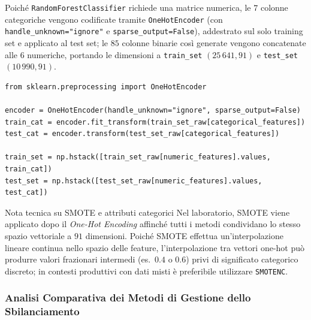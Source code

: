 Poich\'e \texttt{RandomForestClassifier} richiede una matrice numerica, le $7$ colonne categoriche vengono codificate tramite \texttt{OneHotEncoder} (con \texttt{handle\_\allowbreak unknown="ignore"} e \texttt{sparse\_\allowbreak output=False}), addestrato sul solo training set e applicato al test set; le $85$ colonne binarie cos\`i generate vengono concatenate alle $6$ numeriche, portando le dimensioni a \texttt{train\_set} $(25\,641, 91)$ e \texttt{test\_set} $(10\,990, 91)$.

\begin{lstlisting}[style=pythoncode, caption={Codifica One-Hot appresa sul solo training set per evitare data leakage.}]
from sklearn.preprocessing import OneHotEncoder

encoder = OneHotEncoder(handle_unknown="ignore", sparse_output=False)
train_cat = encoder.fit_transform(train_set_raw[categorical_features])
test_cat = encoder.transform(test_set_raw[categorical_features])

train_set = np.hstack([train_set_raw[numeric_features].values, train_cat])
test_set = np.hstack([test_set_raw[numeric_features].values, test_cat])
\end{lstlisting}

\begin{noteblock}{Nota tecnica su SMOTE e attributi categorici}
Nel laboratorio, SMOTE viene applicato dopo il \textit{One-Hot Encoding} affinch\'e tutti i metodi condividano lo stesso spazio vettoriale a $91$ dimensioni. Poich\'e SMOTE effettua un'interpolazione lineare continua nello spazio delle feature, l'interpolazione tra vettori one-hot pu\`o produrre valori frazionari intermedi (es.\ $0.4$ o $0.6$) privi di significato categorico discreto; in contesti produttivi con dati misti \`e preferibile utilizzare \texttt{SMOTENC}.
\end{noteblock}

\FloatBarrier
\subsubsection{Analisi Comparativa dei Metodi di Gestione dello Sbilanciamento}
\label{subsec:dm-lab-adult-results}

